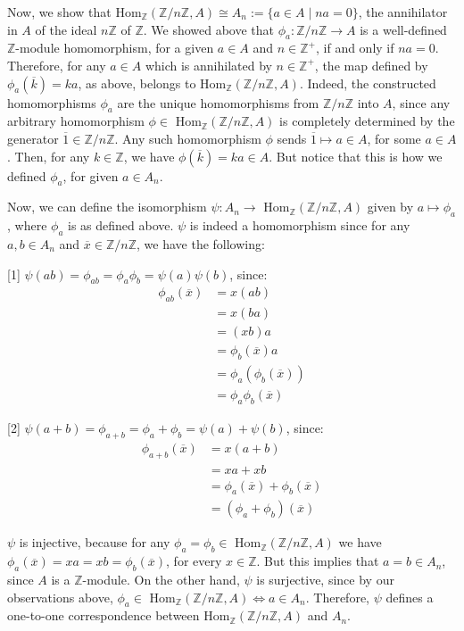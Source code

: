 Now, we show that Hom$_\mathbb{Z}(\mathbb{Z}/n\mathbb{Z}, A) \cong A_n := \{a \in A \mid na = 0\}$, the annihilator in $A$ of the ideal $n\mathbb{Z}$ of $\mathbb{Z}$. We showed above that $\phi_a: \mathbb{Z}/n\mathbb{Z} \rightarrow A$ is a well-defined $\mathbb{Z}$-module homomorphism, for a given $a \in A$ and $n \in \mathbb{Z}^+$, if and only if $na = 0$. Therefore, for any $a \in A$ which is annihilated by $n \in \mathbb{Z}^+$, the map defined by $\phi_a(\overline{k}) = ka$, as above, belongs to Hom$_\mathbb{Z}(\mathbb{Z}/n\mathbb{Z}, A)$. Indeed, the constructed homomorphisms $\phi_a$ are the unique homomorphisms from $\mathbb{Z}/n\mathbb{Z}$ into $A$, since any arbitrary homomorphism $\phi \in$ Hom$_\mathbb{Z}(\mathbb{Z}/n\mathbb{Z}, A)$ is completely determined by the generator $\overline{1} \in \mathbb{Z}/n\mathbb{Z}$. Any such homomorphism $\phi$ sends $\overline{1} \mapsto a \in A$, for some $a \in A$. Then, for any $k \in \mathbb{Z}$, we have $\phi(\overline{k}) = ka \in A$. But notice that this is how we defined $\phi_a$, for given $a \in A_n$.

Now, we can define the isomorphism $\psi: A_n \rightarrow$ Hom$_\mathbb{Z}(\mathbb{Z}/n\mathbb{Z}, A)$ given by $a \mapsto \phi_a$, where $\phi_a$ is as defined above. $\psi$ is indeed a homomorphism since for any $a,b \in A_n$ and $\overline{x} \in \mathbb{Z}/n\mathbb{Z}$, we have the following:

[1] $\psi(ab) = \phi_{ab} = \phi_a\phi_b = \psi(a)\psi(b)$, since:
\begin{align*}
    \phi_{ab}(\overline{x}) &= x(ab) \\
    &= x(ba) \\
    &= (xb)a \\
    &= \phi_b(\overline{x})a \\
    &= \phi_a(\phi_b(\overline{x})) \\
    &= \phi_a\phi_b(\overline{x})
\end{align*}

[2] $\psi(a+b) = \phi_{a+b} = \phi_a+\phi_b = \psi(a)+\psi(b)$, since:
\begin{align*}
    \phi_{a+b}(\overline{x}) &= x(a+b) \\
    &= xa + xb \\
    &= \phi_a(\overline{x})+\phi_b(\overline{x}) \\
    &= (\phi_a+\phi_b)(\overline{x})
\end{align*}

$\psi$ is injective, because for any $\phi_a = \phi_b \in$ Hom$_\mathbb{Z}(\mathbb{Z}/n\mathbb{Z},A)$ we have $\phi_a(\overline{x}) = xa = xb = \phi_b(\overline{x})$, for every $x \in \mathbb{Z}$. But this implies that $a = b \in A_n$, since $A$ is a $\mathbb{Z}$-module. On the other hand, $\psi$ is surjective, since by our observations above, $\phi_a \in$ Hom$_\mathbb{Z}(\mathbb{Z}/n\mathbb{Z},A) \iff a \in A_n$. Therefore, $\psi$ defines a one-to-one correspondence between Hom$_\mathbb{Z}(\mathbb{Z}/n\mathbb{Z},A)$ and $A_n$.